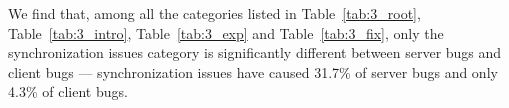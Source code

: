 We find that, among all the categories listed in Table~\ref{tab:3_root}, Table~\ref{tab:3_intro}, Table~\ref{tab:3_exp} and Table~\ref{tab:3_fix},
only the synchronization issues category
is significantly different between server bugs 
and client bugs ---
synchronization issues have caused 31.7\% of server bugs and only 
4.3\% of client bugs.

